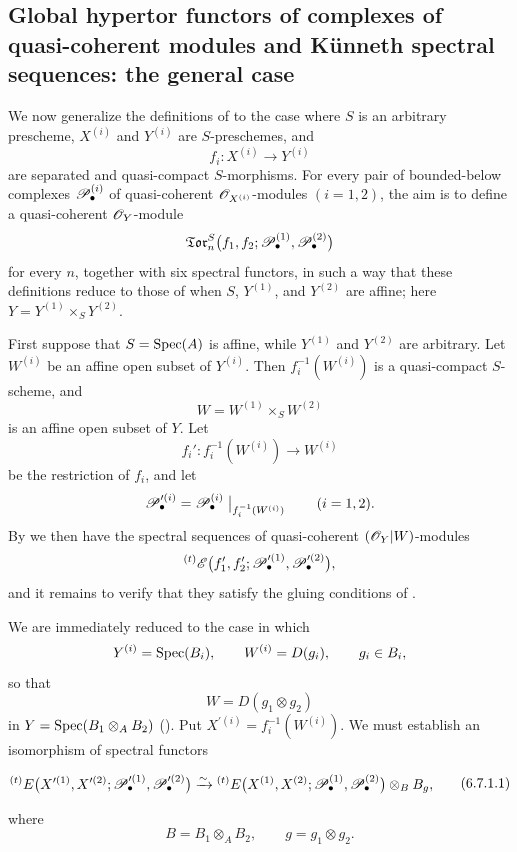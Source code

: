 \subsection{Global hypertor functors of complexes of quasi-coherent modules and K\"unneth spectral sequences: the general case}
\label{subsection:III.6.7}

\begin{env}[6.7.1]
\label{III.6.7.1}
We now generalize the definitions of  to the
case where $S$ is an arbitrary prescheme, $X^{(i)}$ and
$Y^{(i)}$ are $S$-preschemes, and
\[
  f_i:X^{(i)}\longrightarrow Y^{(i)}
\]
are separated and quasi-compact $S$-morphisms.  For every pair
of bounded-below complexes $\mathscr{P}_\bullet^{(i)}$ of
quasi-coherent $\mathscr{O}_{X^{(i)}}$-modules $(i=1,2)$, the aim is to
define a quasi-coherent $\mathscr{O}_Y$-module
\[
  \mathfrak{Tor}_n^S
  \bigl(
    f_1,f_2;
    \mathscr{P}_\bullet^{(1)},\mathscr{P}_\bullet^{(2)}
  \bigr)
\]
for every $n$, together with six spectral functors, in such a way
that these definitions reduce to those of  when
$S$, $Y^{(1)}$, and $Y^{(2)}$ are affine; here
$Y=Y^{(1)}\times_SY^{(2)}$.

First suppose that $S=\operatorname{Spec}(A)$ is affine, while $Y^{(1)}$ and
$Y^{(2)}$ are arbitrary.  Let $W^{(i)}$ be an affine open subset
of $Y^{(i)}$.  Then $f_i^{-1}(W^{(i)})$ is a quasi-compact
$S$-scheme, and
\[
  W=W^{(1)}\times_SW^{(2)}
\]
is an affine open subset of $Y$.  Let
\[
  f_i':f_i^{-1}(W^{(i)})\longrightarrow W^{(i)}
\]
be the restriction of $f_i$, and let
\[
  \mathscr{P}_\bullet^{\prime(i)}
  =
  \mathscr{P}_\bullet^{(i)}
  \bigm|_{f_i^{-1}(W^{(i)})}
  \qquad(i=1,2).
\]
By  we then have the spectral sequences of
quasi-coherent $(\mathscr{O}_Y|W)$-modules
\[
  {}^{(t)}\mathscr{E}
  \bigl(
    f_1',f_2';
    \mathscr{P}_\bullet^{\prime(1)},\mathscr{P}_\bullet^{\prime(2)}
  \bigr),
\]
and it remains to verify that they satisfy the gluing conditions
of .

We are immediately reduced to the case in which
\[
  Y^{(i)}=\operatorname{Spec}(B_i),
  \qquad
  W^{(i)}=D(g_i),
  \qquad g_i\in B_i,
\]
so that
\[
  W=D(g_1\otimes g_2)
\]
in $Y=\operatorname{Spec}(B_1\otimes_AB_2)$
().  Put
$X^{\prime(i)}=f_i^{-1}(W^{(i)})$.  We must establish an
isomorphism of spectral functors
\begin{env}[6.7.1.1]
\label{III.6.7.1.1}
\[
\begin{split}
  {}^{(t)}E
  \bigl(
    X^{\prime(1)},X^{\prime(2)};
    \mathscr{P}_\bullet^{\prime(1)},\mathscr{P}_\bullet^{\prime(2)}
  \bigr)
  \xrightarrow{\sim}
  {}^{(t)}E
  \bigl(
    X^{(1)},X^{(2)};
    \mathscr{P}_\bullet^{(1)},\mathscr{P}_\bullet^{(2)}
  \bigr)
  \otimes_BB_g ,
\end{split}
\tag{6.7.1.1}\label{III.6.7.1.1.eq}
\]
\end{env}
where
\[
  B=B_1\otimes_AB_2,
  \qquad
  g=g_1\otimes g_2.
\]


\end{env}
